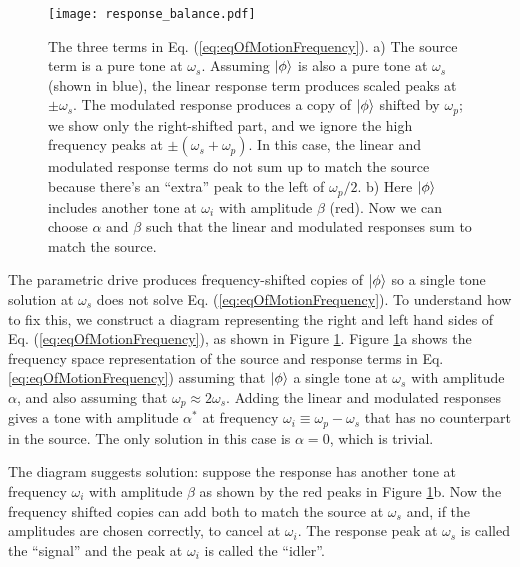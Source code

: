 \begin{figure}
\begin{centering}
\texttt{[image: response\_balance.pdf]}
\par\end{centering}
\caption{The three terms in Eq. (\ref{eq:eqOfMotionFrequency}).
a) The source term is a pure tone at $\omega_s$.
Assuming $| \phi \rangle$ is also a pure tone at $\omega_s$ (shown in blue), the linear response term produces scaled peaks at $\pm \omega_s$.
The modulated response produces a copy of $| \phi \rangle$ shifted by $\omega_p$; we show only the right-shifted part, and we ignore the high frequency peaks at $\pm (\omega_s + \omega_p)$.
In this case, the linear and modulated response terms do not sum up to match the source because there's an ``extra'' peak to the left of $\omega_p/2$.
b) Here $| \phi \rangle$ includes another tone at $\omega_i$ with amplitude $\beta$ (red).
Now we can choose $\alpha$ and $\beta$ such that the linear and modulated responses sum to match the source.}
\label{Fig:responseBalance}
\end{figure}

The parametric drive produces frequency-shifted copies of $| \phi \rangle$ so a single tone solution at $\omega_s$ does not solve Eq. (\ref{eq:eqOfMotionFrequency}).
To understand how to fix this, we construct a diagram representing the right and left hand sides of Eq. (\ref{eq:eqOfMotionFrequency}), as shown in Figure \ref{Fig:responseBalance}.
Figure \ref{Fig:responseBalance}a shows the frequency space representation of the source and response terms in Eq. \ref{eq:eqOfMotionFrequency}) assuming that $| \phi \rangle$ a single tone at $\omega_s$ with amplitude $\alpha$, and also assuming that $\omega_p \approx 2 \omega_s$.
Adding the linear and modulated responses gives a tone with amplitude $\alpha^*$ at frequency $\omega_i \equiv \omega_p - \omega_s$ that has no counterpart in the source.
The only solution in this case is $\alpha=0$, which is trivial.

The diagram suggests solution: suppose the response has another tone at frequency $\omega_i$ with amplitude $\beta$ as shown by the red peaks in Figure \ref{Fig:responseBalance}b.
Now the frequency shifted copies can add both to match the source at $\omega_s$ and, if the amplitudes are chosen correctly, to cancel at $\omega_i$.
The response peak at $\omega_s$ is called the ``signal'' and the peak at $\omega_i$ is called the ``idler''.

